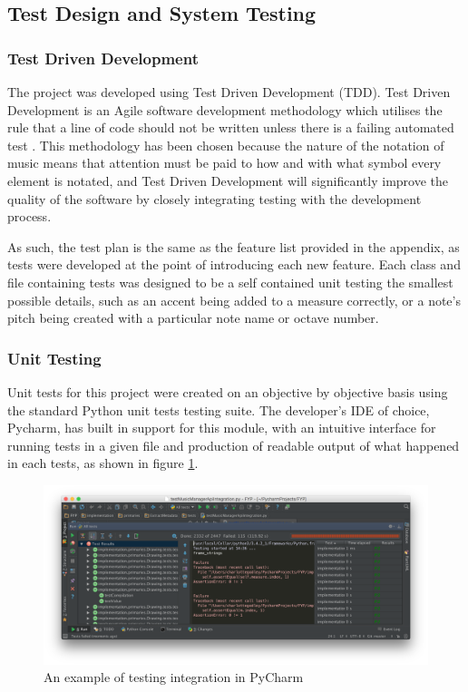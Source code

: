 \subsection{Test Design and System Testing}
\subsubsection{Test Driven Development}
The project was developed using Test Driven Development (TDD). Test Driven Development is an Agile software development methodology which utilises the rule that a line of code should not be written unless there is a failing automated test \parencite{TDD}. This methodology has been chosen because the nature of the notation of music means that attention must be paid to how and with what symbol every element is notated, and Test Driven Development will significantly improve the quality of the software by closely integrating testing with the development process.

As such, the test plan is the same as the feature list provided in the appendix, as tests were developed at the point of introducing each new feature. Each class and file containing tests was designed to be a self contained unit testing the smallest possible details, such as an accent being added to a measure correctly, or a note's pitch being created with a particular note name or octave number.

\subsubsection{Unit Testing}
Unit tests for this project were created on an objective by objective basis using the standard Python unit tests testing suite. The developer's IDE of choice, Pycharm, has built in support for this module, with an intuitive interface for running tests in a given file and production of readable output of what happened in each tests, as shown in figure \ref{fig:testing_interface}.

\begin{figure}[h]
	\centering
	\includegraphics[width=\textwidth]{testing_interface}	
	\caption{An example of testing integration in PyCharm}
	\label{fig:testing_interface}
\end{figure}

